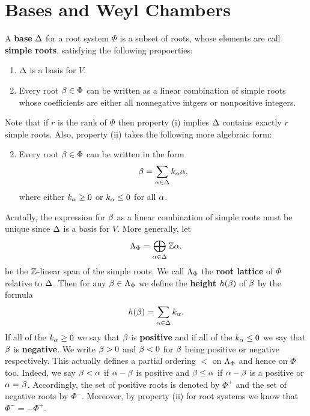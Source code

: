 \documentclass[12pt,reqno,oneside]{amsart}
\begin{document}
\section{Bases and Weyl Chambers}
    A \textbf{base} $\Delta$ for a root system $\Phi$ is a subset of roots, whose elements are call \textbf{simple roots}, satisfying the following propoerties:

    \begin{enumerate}[label=(\roman*)]
        \item $\Delta$ is a basis for $V$.
        \item Every root $\beta \in \Phi$ can be written as a linear combination of simple roots whose coefficients are either all nonnegative intgers or nonpositive integers.
    \end{enumerate}

    Note that if $r$ is the rank of $\Phi$ then property (i) implies $\Delta$ contains exactly $r$ simple roots. Also, property (ii) takes the following more algebraic form:

    \begin{enumerate}[label=(\roman*)]
        \setcounter{enumi}{1}
        \item Every root $\beta \in \Phi$ can be written in the form
        \[
            \beta = \sum_{\alpha \in \Delta}k_{\alpha}\alpha,
        \]
        where either $k_{\alpha} \ge 0$ or $k_{\alpha} \le 0$ for all $\alpha$.
    \end{enumerate}

    Acutally, the expression for $\beta$ as a linear combination of simple roots must be unique since $\Delta$ is a basis for $V$. More generally, let
    \[
        \Lambda_{\Phi} = \bigoplus_{\alpha \in \Delta}\mathbb{Z}\alpha.
    \]
    be the $\mathbb{Z}$-linear span of the simple roots. We call $\Lambda_{\Phi}$ the \textbf{root lattice} of $\Phi$ relative to $\Delta$. Then for any $\beta \in \Lambda_{\Phi}$ we define the \textbf{height} $h(\beta)$ of $\beta$ by the formula
    \[
        h(\beta) = \sum_{\alpha \in \Delta}k_{\alpha}.
    \]
    If all of the $k_{\alpha} \ge 0$ we say that $\beta$ is \textbf{positive} and if all of the $k_{\alpha} \le 0$ we say that $\beta$ is \textbf{negative}. We write $\beta > 0$ and $\beta < 0$ for $\beta$ being positive or negative respectively. This actually defines a partial ordering $<$ on $\Lambda_{\Phi}$ and hence on $\Phi$ too. Indeed, we say $\beta < \alpha$ if $\alpha-\beta$ is positive and $\beta \le \alpha$ if $\alpha-\beta$ is a positive or $\alpha = \beta$. Accordingly, the set of positive roots is denoted by $\Phi^{+}$ and the set of negative roots by $\Phi^{-}$. Moreover, by property (ii) for root systems we know that $\Phi^{-} = -\Phi^{+}$.
\end{document}
